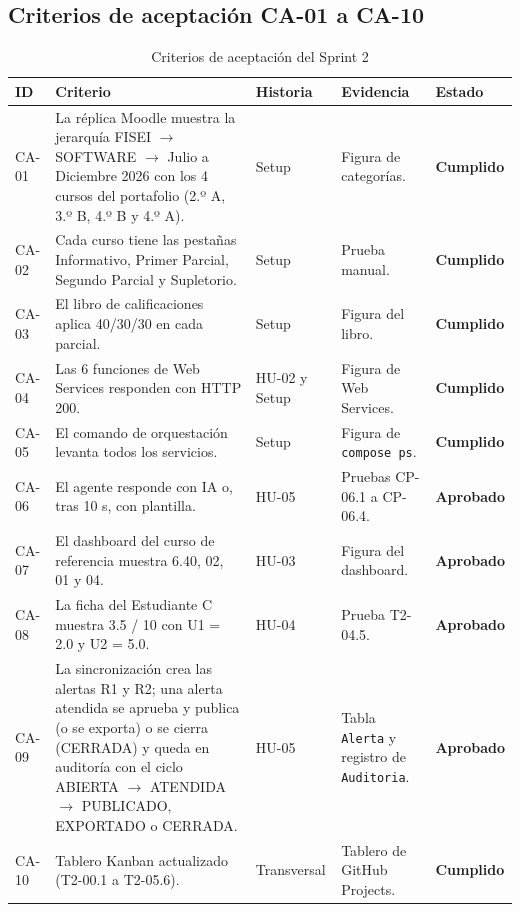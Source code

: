 \documentclass[11pt,a4paper]{article}
\newcommand{\hd}[1]{\textbf{#1}}
\begin{document}
\subsection{Criterios de aceptación CA-01 a CA-10}
\begin{table}[H]
\centering\small
\caption{Criterios de aceptación del Sprint 2}
\begin{tabularx}{\textwidth}{|R{1.4cm}|Y|R{1.9cm}|R{3.0cm}|R{1.8cm}|}
\hline
\hd{ID} & \hd{Criterio} & \hd{Historia} & \hd{Evidencia} & \hd{Estado}\\ \hline
CA-01 & La réplica Moodle muestra la jerarquía FISEI $\rightarrow$ SOFTWARE $\rightarrow$ Julio a Diciembre 2026 con los 4 cursos del portafolio (2.º A, 3.º B, 4.º B y 4.º A). & Setup & Figura de categorías. & \textbf{Cumplido}\\ \hline
CA-02 & Cada curso tiene las pestañas Informativo, Primer Parcial, Segundo Parcial y Supletorio. & Setup & Prueba manual. & \textbf{Cumplido}\\ \hline
CA-03 & El libro de calificaciones aplica 40/30/30 en cada parcial. & Setup & Figura del libro. & \textbf{Cumplido}\\ \hline
CA-04 & Las 6 funciones de Web Services responden con HTTP 200. & HU-02 y Setup & Figura de Web Services. & \textbf{Cumplido}\\ \hline
CA-05 & El comando de orquestación levanta todos los servicios. & Setup & Figura de \texttt{compose ps}. & \textbf{Cumplido}\\ \hline
CA-06 & El agente responde con IA o, tras 10 s, con plantilla. & HU-05 & Pruebas CP-06.1 a CP-06.4. & \textbf{Aprobado}\\ \hline
CA-07 & El dashboard del curso de referencia muestra 6.40, 02, 01 y 04. & HU-03 & Figura del dashboard. & \textbf{Aprobado}\\ \hline
CA-08 & La ficha del Estudiante C muestra 3.5 / 10 con U1 = 2.0 y U2 = 5.0. & HU-04 & Prueba T2-04.5. & \textbf{Aprobado}\\ \hline
CA-09 & La sincronización crea las alertas R1 y R2; una alerta atendida se aprueba y publica (o se exporta) o se cierra (CERRADA) y queda en auditoría con el ciclo ABIERTA $\rightarrow$ ATENDIDA $\rightarrow$ PUBLICADO, EXPORTADO o CERRADA. & HU-05 & Tabla \texttt{Alerta} y registro de \texttt{Auditoria}. & \textbf{Aprobado}\\ \hline
CA-10 & Tablero Kanban actualizado (T2-00.1 a T2-05.6). & Transversal & Tablero de GitHub Projects. & \textbf{Cumplido}\\ \hline
\end{tabularx}
\end{table}
\end{document}
